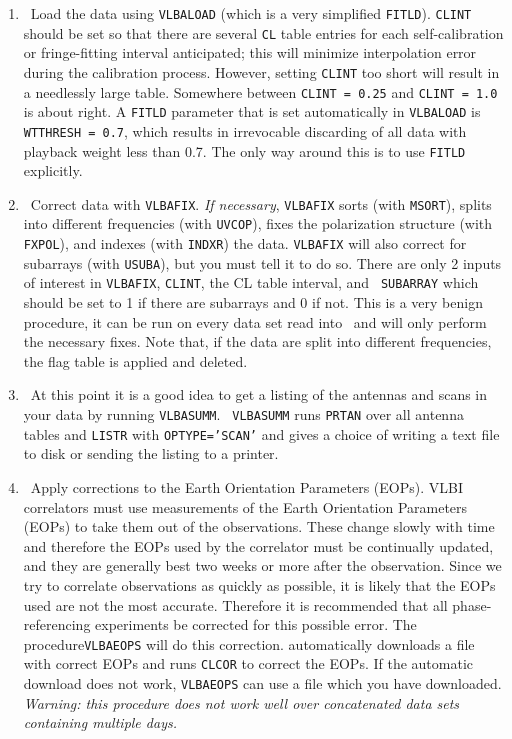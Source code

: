\begin{enumerate}

\item\ {Load the data using {\tt VLBALOAD} (which is a very simplified
{\tt FITLD}).  {\tt CLINT} should be set so that there are several
{\tt CL} table entries for each self-calibration or fringe-fitting
interval anticipated; this will minimize interpolation error during
the calibration process.  However, setting {\tt CLINT} too short will
result in a needlessly large table.  Somewhere between {\tt CLINT =
0.25} and {\tt CLINT = 1.0} is about right.  A {\tt FITLD} parameter
that is set automatically in {\tt VLBALOAD} is {\tt WTTHRESH = 0.7},
which results in irrevocable discarding of all data with playback
weight less than 0.7.  The only way around this is to use {\tt FITLD}
}explicitly.

\item\ Correct data with {\tt VLBAFIX}\@. {\it If
necessary}, {\tt VLBAFIX} sorts (with {\tt MSORT})\@, splits into
different frequencies (with {\tt UVCOP})\@, fixes the polarization
structure (with {\tt FXPOL}), and indexes (with {\tt INDXR}) the data.
{\tt VLBAFIX} will also correct for subarrays (with {\tt USUBA}), but
you must tell it to do so.  There are only 2 inputs of interest in
{\tt VLBAFIX}, {\tt CLINT}\@, the CL table interval, and {\tt
SUBARRAY} which should be set to 1 if there are subarrays and 0 if
not.  This is a very benign procedure, it can be run on
every data set read into \AIPS\ and will only perform the
necessary fixes.  Note that, if the data are split into different
frequencies, the flag table is applied and deleted.

\item\ {At this point it is a good idea to get a listing of the
antennas and scans in your data by running {\tt VLBASUMM}\@.  {\tt
VLBASUMM} runs {\tt PRTAN} over all antenna tables and {\tt LISTR}
with {\tt OPTYPE='SCAN'} and gives a choice of writing a text file to
disk or sending the listing to a printer.
}

\item\ {Apply corrections to the Earth Orientation Parameters (EOPs).
VLBI correlators must use measurements of the Earth Orientation
Parameters (EOPs) to take them out of the observations.  These change
slowly with time and therefore the EOPs used by the correlator must be
continually updated, and they are generally best two weeks or more after
the observation.  Since we try to correlate observations as quickly as
possible, it is likely that the EOPs used are not the most accurate.
Therefore it is recommended that all phase-referencing experiments be
corrected for this possible error.  The procedure{\tt VLBAEOPS} will do
this correction.  {\tt {}} automatically downloads a file
with correct EOPs and runs {\tt CLCOR} to correct the EOPs.  If the
automatic download does not work, {\tt VLBAEOPS} can use a file which
you have downloaded.  {\it Warning: this procedure does not work well
over concatenated data sets containing multiple days.}}


\end{enumerate}
